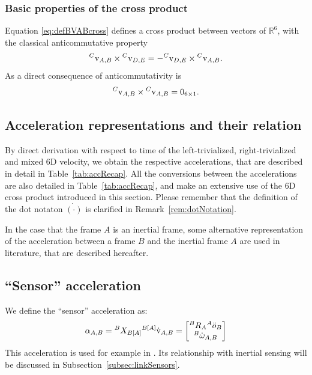 \subsubsection{Basic properties of the cross product}

Equation \eqref{eq:defBVABcross} defines a cross product between vectors of $\mathbb{R}^6$, with the classical anticommutative property
\begin{equation}
\hspace{0em}^C{\rm v}_{A,B}\times \hspace{0em}^C{\rm v}_{D,E}
=
-\hspace{0em}^C{\rm v}_{D,E}\times\hspace{0em}^C{\rm v}_{A,B} .
\end{equation}
As a direct consequence of anticommutativity is 
\begin{equation}
\label{eq:autoCrossIsNull}
\hspace{0em}^C{\rm v}_{A,B} \times \hspace{0em}^C{\rm v}_{A,B} = 0_{6 \times 1}.
\end{equation}

\subsection{Acceleration representations and their relation}
By direct derivation with respect to time of the left-trivialized, right-trivialized and mixed 6D velocity, we obtain the respective accelerations, that are described in detail in Table~\ref{tab:accRecap}. All the conversions between the accelerations are also detailed in Table~\ref{tab:accRecap}, and make an extensive use of the 6D cross product introduced in this section. Please remember that the definition of the dot notaton $\dot{(\cdot)}$ is clarified in Remark~\ref{rem:dotNotation}.

In the case that the frame $A$ is an inertial frame, some alternative representation of the acceleration between a frame $B$ and the inertial frame $A$ are used in literature, that are described hereafter.
\subsection{``Sensor'' acceleration}
We define the ``sensor'' acceleration as:
\begin{equation}
    \alpha_{A,B} = \hspace{0em}^B X_{B[A]} \hspace{0em}^{B[A]} \dot{{\rm v}}_{A,B} 
    = 
    \begin{bmatrix}
   \hspace{0em}^B R_A \hspace{0em}^A \ddot{o}_B \\
   \hspace{0em}^B \dot{\omega}_{A,B}
\end{bmatrix}
\end{equation}
This acceleration is used for example in \citep{siciliano2010robotics}. Its relationship with inertial sensing will be discussed in Subsection~\ref{subsec:linkSensors}. 

